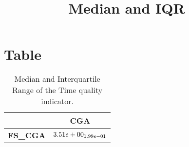 \documentclass{article}
\title{Median and IQR}
\author{}
\begin{document}
\maketitle
\section{Table}
\begin{table}[!htp]
  \caption{Median and Interquartile Range of the Time quality indicator.}
  \label{table:Time}
  \centering
  \begin{scriptsize}
  \begin{tabular}{c|c}
      & \textbf{CGA} \\\hline
      \textbf{FS_CGA} & $\cellcolor{gray95} \cellcolor{gray25} 3.51e+00_{1.99e-01}$ \\
  \end{tabular}
  \end{scriptsize}
\end{table}
\end{document}
